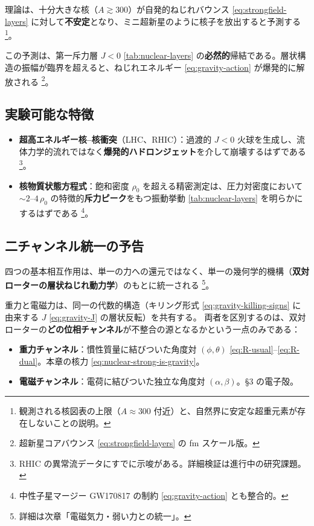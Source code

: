 \documentclass[dvipdfmx,a4paper,oneside]{jsbook}
\numberwithin{equation}{chapter}
\begin{document}
理論は、十分大きな核（\(A \gtrsim 300\)）が自発的ねじれバウンス \eqref{eq:strongfield-layers} に対して\textbf{不安定}となり、ミニ超新星のように核子を放出すると予測する \footnote{観測される核図表の上限（\(A \approx 300\) 付近）と、自然界に安定な超重元素が存在しないことの説明。}。

この予測は、第一斥力層 \(J < 0\) \eqref{tab:nuclear-layers} の\textbf{必然的}帰結である。層状構造の振幅が臨界を超えると、ねじれエネルギー \eqref{eq:gravity-action} が爆発的に解放される \footnote{超新星コアバウンス \eqref{eq:strongfield-layers} の fm スケール版。}。

\subsection{実験可能な特徴}

\begin{itemize}[leftmargin=2em]
  \item \textbf{超高エネルギー核--核衝突}（LHC、RHIC）：過渡的 \(J < 0\) 火球を生成し、流体力学的流れではなく\textbf{爆発的ハドロンジェット}を介して崩壊するはずである \footnote{RHIC の異常流データにすでに示唆がある。詳細検証は進行中の研究課題。}。
  \item \textbf{核物質状態方程式}：飽和密度 \(\rho_0\) を超える精密測定は、圧力対密度において \(\sim 2\)–\(4\,\rho_0\) の特徴的\textbf{斥力ピーク}をもつ振動挙動 \eqref{tab:nuclear-layers} を明らかにするはずである \footnote{中性子星マージー GW170817 の制約 \eqref{eq:gravity-action} とも整合的。}。
\end{itemize}

\subsection{二チャンネル統一の予告}

四つの基本相互作用は、単一の力への還元ではなく、単一の幾何学的機構（\textbf{双対ローターの層状ねじれ動力学}）のもとに統一される \footnote{詳細は次章「電磁気力・弱い力との統一」。}。

重力と電磁力は、同一の代数的構造（キリング形式 \eqref{eq:gravity-killing-signs} に由来する \(J\) \eqref{eq:gravity-J} の層状反転）を共有する。
両者を区別するのは、双対ローターの\textbf{どの位相チャンネル}が不整合の源となるかという一点のみである：
\begin{itemize}[leftmargin=2em]
  \item \textbf{重力チャンネル}：慣性質量に結びついた角度対 \((\phi, \theta)\) \eqref{eq:R-usual}–\eqref{eq:R-dual}。本章の核力 \eqref{eq:nuclear-strong-is-gravity}。
  \item \textbf{電磁チャンネル}：電荷に結びついた独立な角度対 \((\alpha, \beta)\)。§3 の電子殻。
\end{itemize}
\end{document}
